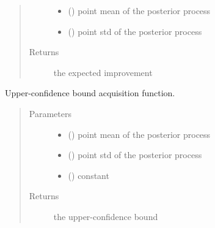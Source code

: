 \documentclass[letterpaper,10pt,english]{sphinxmanual}
\begin{document}
\begin{fulllineitems}
\begin{fulllineitems}
\begin{quote}
\begin{description}
\begin{itemize}
\item {} 
 () \textendash{} point mean of the posterior process

\item {} 
 () \textendash{} point std of the posterior process

\end{itemize}

\item[{Returns}] \leavevmode
the expected improvement

\end{description}\end{quote}

\end{fulllineitems}


\begin{fulllineitems}
\label{\detokenize{index:bo.acquisition.Acquisition.gpucb}}
Upper-confidence bound acquisition function.
\begin{quote}\begin{description}
\item[{Parameters}] \leavevmode\begin{itemize}
\item {} 
 () \textendash{} point mean of the posterior process

\item {} 
 () \textendash{} point std of the posterior process

\item {} 
 () \textendash{} constant

\end{itemize}

\item[{Returns}] \leavevmode
the upper-confidence bound


\end{description}
\end{quote}
\end{fulllineitems}
\end{fulllineitems}
\end{document}
